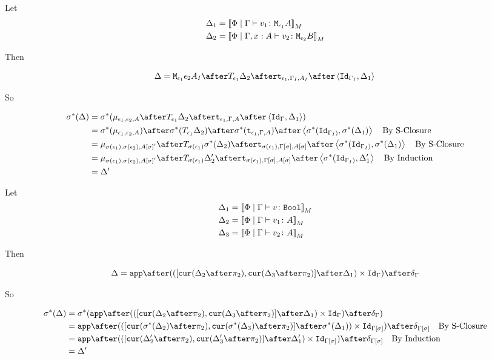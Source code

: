 \documentclass{report}
\renewcommand\star[0]{^*}
\begin{document}
Let \begin{align}
    \Delta_1 &= {\bf [\![}\Phi\mid\Gamma \vdash v_1 \colon \texttt{M}_{\epsilon_1}{A}{\bf ]\!]}_M\\
    \Delta_2 &= {\bf [\![}\Phi\mid\Gamma, x: A \vdash v_2 \colon \texttt{M}_{\epsilon_2}{B}{\bf ]\!]}_M
\end{align}

Then

\begin{equation}
    \D = \M{\e_1}{\e_2}{A_I}\after\T{\e_1}{\D_2}\after\tstrength{\e_1}{\G_I}{A_I}\after\pr{\Id{\G_{I}}}{\D_1}\\
\end{equation}

So

\begin{align}
    \si\star(\D) &= \si\star(\bind{\e_1}{\e_2}{A}\after\T{\e_1}{\D_2}\after\tstrength{\e_1}{\G}{A}\after\pr{\Id{\G}}{\D_1})\\
    & = \si\star(\bind{\e_1}{\e_2}{A})\after\si\star(\T{\e_1}{\D_2})\after\si\star(\tstrength{\e_1}{\G}{A})\after\pr{\si\star(\Id{\G_{I})}}{\si\star(\D_1)}\qt{By S-Closure}\\
    &= \bind{\si(\e_1)}{\si(\e_2)}{A\ssi'}\after\T{\si(\e_1)}{\si\star(\D_2)}\after\tstrength{\si(\e_1)}{\G\ssi}{A\ssi}\after\pr{\si\star(\Id{\G_{I})}}{\si\star(\D_1)}\qt{By S-Closure}\\
    &= \bind{\si(\e_1)}{\si(\e_2)}{A\ssi'}\after\T{\si(\e_1)}{\D_2'}\after\tstrength{\si(\e_1)}{\G\ssi}{A\ssi}\after\pr{\si\star(\Id{\G_{I})}}{\D_1'}\qt{By Induction}\\
    &= \D'\\
\end{align}


Let \begin{align}
    \Delta_1 &= {\bf [\![}\Phi\mid\Gamma \vdash v \colon \texttt{Bool}{\bf ]\!]}_M\\
    \Delta_2 &= {\bf [\![}\Phi\mid\Gamma \vdash v_1 \colon A{\bf ]\!]}_M\\
    \Delta_3 &= {\bf [\![}\Phi\mid\Gamma \vdash v_2 \colon A{\bf ]\!]}_M\\
\end{align}

Then

\begin{equation}
    \D = \app\after(([\cur{\D_2\after\pp}, \cur{\D_3\after\pp}]\after\D_1)\times\Id{\G})\after\diag{\G}\\
\end{equation}

So

\begin{align}
    \si\star(\D) &= \si\star(\app\after(([\cur{\D_2\after\pp}, \cur{\D_3\after\pp}]\after\D_1)\times\Id{\G})\after\diag{\G})\\
    &= \app\after(([\cur{\si\star(\D_2)\after\pp}, \cur{\si\star(\D_3)\after\pp}]\after\si\star(\D_1))\times\Id{\G\ssi})\after\diag{\G\ssi}\qt{By S-Closure}\\
    &= \app\after(([\cur{\D_2'\after\pp}, \cur{\D_3'\after\pp}]\after\D_1')\times\Id{\G\ssi})\after\diag{\G\ssi}\qt{By Induction}\\
    & = \D'\\
\end{align}
\end{document}

